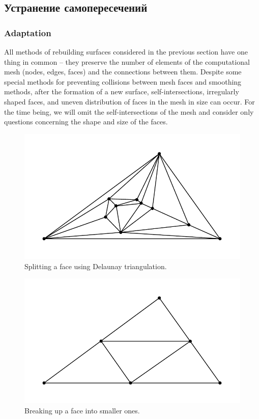 \subsection{Устранение самопересечений}

\subsubsection{Adaptation}

\cite{Freylekhman2022GeoIntersect}

All methods of rebuilding surfaces considered in the previous section have one thing in common -- they preserve the number of elements of the computational mesh (nodes, edges, faces) and the connections between them.
Despite some special methods for preventing collisions between mesh faces and smoothing methods, after the formation of a new surface, self-intersections, irregularly shaped faces, and uneven distribution of faces in the mesh in size can occur.
For the time being, we will omit the self-intersections of the mesh and consider only questions concerning the shape and size of the faces.

\begin{figure}[h]
\centering
\includegraphics[width=\textwidth]{pics/text_1_int/pic_delaunay.pdf}
\caption{Splitting a face using Delaunay triangulation.}\label{fig:pic_delaunay}
\end{figure}

\begin{figure}[h]
\centering
\includegraphics[width=\textwidth]{pics/text_1_int/pic_delaunay_2.pdf}
\caption{Breaking up a face into smaller ones.}\label{fig:pic_delaunay_2}
\end{figure}

